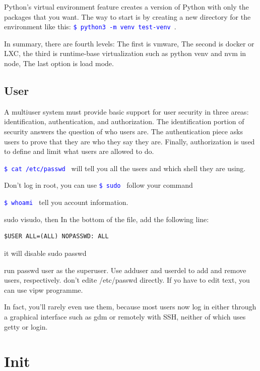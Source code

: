 \documentclass[paper=8.5in:11in, twoside, 12pt, pagesize=pdftex]{book}
\newcommand{\linuxcommand}[1]{\texttt{\textcolor{blue}{\$ #1 \Pisymbol{psy}{191}}}}
\begin{document}
	\par Python’s virtual environment feature creates a version of Python with only the packages that you want. The way to start is by creating a new directory for the environment like this: \linuxcommand{python3 -m venv test-venv}. 
	
	\par In summary, there are fourth levels: The first is vmware, The second is docker or LXC, the third is runtime-base virtualization such as python venv and nvm in node, The last option is load mode. 

\subsection{User}
	\par A multiuser system must provide basic support for user security in three areas: identification, authentication, and authorization. The identification portion of security answers the question of who users are. The authentication piece asks users to prove that they are who they say they are. Finally, authorization is used to define and limit what users are allowed to do.

	\par \linuxcommand{cat /etc/passwd} will tell you all the users and which shell they are using.  

	\par Don't log in root, you can use \linuxcommand{sudo} follow your command

	\par \linuxcommand{whoami} tell you account information.
			
	\par sudo visudo, then In the bottom of the file, add the following line:
\begin{lstlisting}
$USER ALL=(ALL) NOPASSWD: ALL
\end{lstlisting}		
		it will disable sudo passwd
		
		\par run passwd user as the superuser. Use adduser and userdel to add and remove users, respectively. don't edite /etc/passwd directly. If yo have to edit text, you can use vipw programme. 
		
		\par In fact, you’ll rarely even use them, because most users now log in either through a graphical interface such as gdm or remotely with SSH, neither of which uses getty or login.
	
\section{Init}
\end{document}

